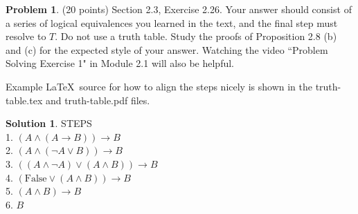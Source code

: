 \documentclass{article}
\theoremstyle{definition}
\newtheorem{problem}{Problem}
\newtheorem*{solution}{Solution}
\begin{document}
\newpage
\begin{problem} (20 points) Section 2.3, Exercise 2.26.
Your answer should consist of a series of logical equivalences 
you learned in the text, and the final step must resolve to $T$.
Do not use a truth table.  Study the proofs of Proposition 2.8 (b) and (c) 
for the expected style of your answer.  Watching the video ``Problem 
Solving Exercise 1" in Module {2.1} will also be helpful.

Example \LaTeX\ source for how to align the steps nicely is shown 
in the truth-table.tex and truth-table.pdf files.
\end{problem}
\begin{solution} 
  STEPS
  \\1. $(A \land (A \rightarrow B)) \rightarrow B$
  \\2. $(A \land (\neg A \lor B)) \rightarrow B$
  \\3. $((A \land \neg A) \lor (A \land B)) \rightarrow B$
  \\4. $(\text{False} \lor (A \land B)) \rightarrow B$
 \\ 5. $(A \land B) \rightarrow B$
  \\6. $B$

\end{solution}
\end{document}
